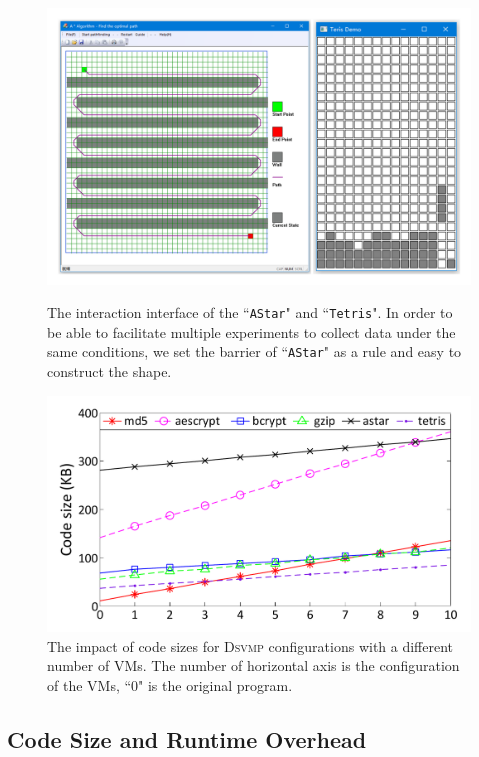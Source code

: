 \documentclass[preprint,12pt,3p]{elsarticle}
\newcommand{\DSVMP}{\textsc{Dsvmp}\xspace}
\begin{document}
\begin{figure}[t]
\centering
\begin{minipage}[t]{0.49\linewidth}
\centering
\includegraphics[width=.9\textwidth]{figure/case2.pdf}
\caption{The interaction interface of the ``\texttt{AStar}" and ``\texttt{Tetris}". In order to be able to facilitate multiple experiments to collect data under the same conditions, we set the barrier of ``\texttt{AStar}" as a rule and easy to construct the shape.}\label{fig:Fig.case}
\end{minipage}
\hspace{0.005\textwidth}
\begin{minipage}[t]{0.49\linewidth}
\centering
\includegraphics[width=.9\textwidth]{figure/codesize.pdf}
\caption{The impact of code sizes for \DSVMP configurations with a different number of VMs. The number of horizontal axis is the configuration of the VMs, ``0" is the original program.}\label{fig:Fig.size}
\end{minipage}
\end{figure}

\subsection{Code Size and Runtime Overhead}\label{sec:benchmarktest}
\end{document}
